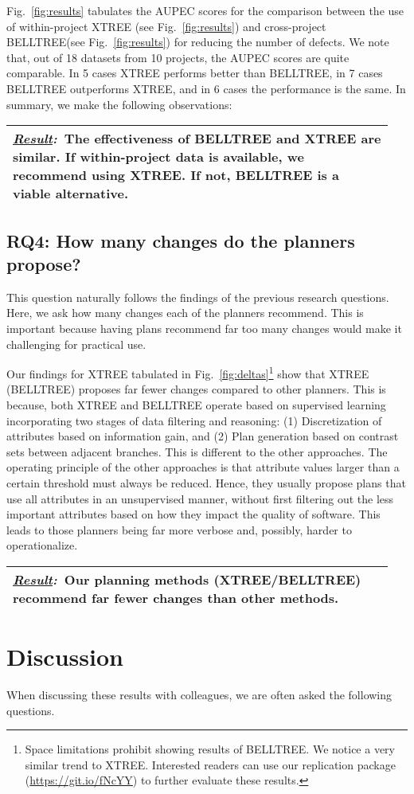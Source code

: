 \documentclass[smallextended]{svjour3}       %
\newcommand{\result}[1]{
\vspace{0.2cm}
\noindent\begin{minipage}{\linewidth}
\begin{tabular}{|p{0.95\linewidth}|}
\hline\vspace{-0.2cm}
\textbf{\textit{\underline{Result}:}}~#1\\\hline
\end{tabular}
\end{minipage}\bigstrut
}
\newcommand{\fig}[1]{Fig.~\ref{fig:#1}}
\begin{document}
\fig{results} tabulates the AUPEC scores for the comparison between the use of within-project XTREE (see \fig{results}\protect{}) and cross-project BELLTREE(see \fig{results}\protect{}) for reducing the number of defects. We note that, out of 18 datasets from 10 projects, the AUPEC scores are quite comparable. In 5 cases XTREE performs better than BELLTREE, in 7 cases BELLTREE outperforms XTREE, and in 6 cases the performance is the same. In summary, we make the following observations:

\result{The effectiveness of BELLTREE and XTREE are similar. If within-project data is available, we recommend using XTREE. If not, BELLTREE is a viable alternative.}

\subsection*{RQ4: How many changes do the planners propose?}

This question naturally follows the findings of the previous research questions. Here, we ask how many changes each of the planners recommend. This is important because having plans recommend far too many changes would make it challenging for practical use. 

Our findings for XTREE tabulated in \fig{deltas}\footnote{Space limitations prohibit showing results of BELLTREE. We notice a very similar trend to XTREE. Interested readers can use our replication package (\url{https://git.io/fNcYY}) to further evaluate these results.} show that XTREE (BELLTREE) proposes far fewer changes compared to other planners. This is because, both XTREE and BELLTREE operate based on supervised learning incorporating two stages of data filtering and reasoning: (1) Discretization of attributes based on information gain, and (2) Plan generation based on contrast sets between adjacent branches. This is different to the other approaches. The operating principle of the other approaches is that attribute values larger than a certain threshold must always be reduced. Hence, they usually propose plans that use all attributes in an unsupervised manner, without first filtering out the less important attributes based on how they impact the quality of software. This leads to those planners being far more verbose and, possibly, harder to operationalize.


\result{Our planning methods (XTREE/BELLTREE) recommend far fewer changes than other methods.}


\section{Discussion}
\label{sect:discuss}
When discussing these results with colleagues, we are often asked the following questions.
\end{document}
